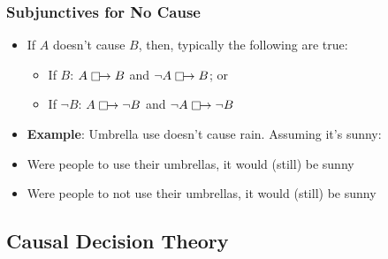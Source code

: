 \begin{frame}
\frametitle{Subjunctives for No Cause}

\begin{itemize}[<+->]

\item If $A$ doesn't cause $B$, then, typically the following are true:
\begin{itemize}

\item If $B$: $A \mathrel{\mathop\Box}\mathrel{\mkern-2.5mu}\rightarrow B$ and $\neg A \mathrel{\mathop\Box}\mathrel{\mkern-2.5mu}\rightarrow B$; or

\item If $\neg B$: $A \mathrel{\mathop\Box}\mathrel{\mkern-2.5mu}\rightarrow \neg B$ and $\neg A \mathrel{\mathop\Box}\mathrel{\mkern-2.5mu}\rightarrow \neg B$

\end{itemize}

\item \textbf{Example}: Umbrella use doesn't cause rain. Assuming it's sunny:

\item[] Were people to use their umbrellas, it would (still) be sunny \\[1ex] 
\item[] Were people to not use their umbrellas, it would (still) be sunny%
\end{itemize}
\end{frame}

\subsection{Causal Decision Theory}

